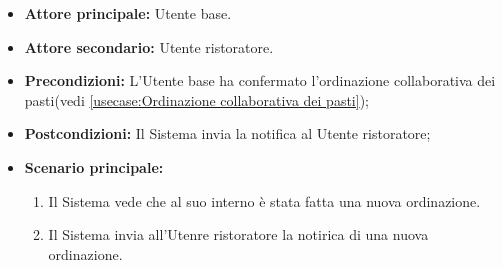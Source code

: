 \label{usecase:Notifica ordine}
\begin{itemize}
	\item \textbf{Attore principale:} Utente base.
	\item \textbf{Attore secondario:} Utente ristoratore.
	
	\item \textbf{Precondizioni:} L'Utente base ha confermato l'ordinazione collaborativa dei pasti(vedi \autoref{usecase:Ordinazione collaborativa dei pasti});

	\item \textbf{Postcondizioni:} Il Sistema invia la notifica al Utente ristoratore;
     
	\item \textbf{Scenario principale:}
	      \begin{enumerate}
                \item Il Sistema vede che al suo interno è stata fatta una nuova ordinazione.
                \item Il Sistema invia all'Utenre ristoratore la notirica di una nuova ordinazione.
	      \end{enumerate}
\end{itemize}
